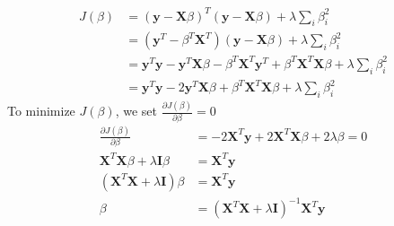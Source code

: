 \begin{align*}
    J(\beta) &= (\mathbf{y}-\mathbf{X}\beta)^T(\mathbf{y}-\mathbf{X}\beta)+\lambda\sum_i\beta_i^2 \\
    &= (\mathbf{y}^T-\beta^T\mathbf{X}^T)(\mathbf{y}-\mathbf{X}\beta)+\lambda\sum_i\beta_i^2 \\
    &= \mathbf{y}^T\mathbf{y}-\mathbf{y}^T\mathbf{X}\beta - \beta^T\mathbf{X}^T\mathbf{y}^T+\beta^T\mathbf{X}^T\mathbf{X}\beta+\lambda\sum_i\beta_i^2 \\
    &= \mathbf{y}^T\mathbf{y}-2\mathbf{y}^T\mathbf{X}\beta+\beta^T\mathbf{X}^T\mathbf{X}\beta+\lambda\sum_i\beta_i^2
\end{align*}
To minimize $J(\beta)$, we set $\frac{\partial J(\beta)}{\partial \beta} = 0$
\begin{align*}
    \frac{\partial J(\beta)}{\partial \beta} &=-2\mathbf{X}^T\mathbf{y} + 2\mathbf{X}^T\mathbf{X}\beta + 2\lambda \beta = 0 \\
    \mathbf{X}^T\mathbf{X}\beta + \lambda\mathbf{I}\beta &= \mathbf{X}^T\mathbf{y} \\
    (\mathbf{X}^T\mathbf{X} + \lambda\mathbf{I})\beta &= \mathbf{X}^T\mathbf{y} \\
    \beta &= (\mathbf{X}^T\mathbf{X} + \lambda\mathbf{I})^{-1}\mathbf{X}^T\mathbf{y}
\end{align*}